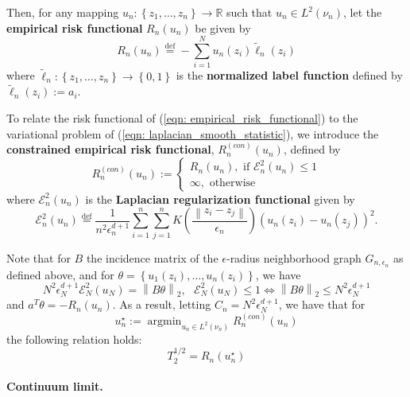 \documentclass{article}
\newcommand{\Reals}{\mathbb{R}}
\newcommand{\norm}[1]{\left\lVert#1\right\rVert}
\newcommand{\defeq}{\overset{\mathrm{def}}{=}}
\newcommand{\set}[1]{\left\{#1\right\}}
\DeclareMathOperator*{\argmin}{argmin}
\theoremstyle{alden}
\theoremstyle{aldenthm}
\theoremstyle{remark}
\begin{document}
Then, for any mapping $u_n: \set{z_1, \ldots, z_n} \to \Reals$ such that $u_n \in L^2(\nu_n)$, let the \textbf{empirical risk functional} $R_n(u_n)$ be given by
\begin{equation}
\label{eqn: empirical_risk_functional}
R_n(u_n) \defeq - \sum_{i = 1}^{N} u_n(z_i) \widetilde{\ell}_n(z_i)
\end{equation}
where $\widetilde{\ell}_n: \set{z_1, \ldots, z_n} \to \set{0,1}$ is the \textbf{normalized label function} defined by $\widetilde{\ell}_n(z_i) := a_i$. 

To relate the risk functional of (\ref{eqn: empirical_risk_functional}) to the variational problem of (\ref{eqn: laplacian_smooth_statistic}), we introduce the \textbf{constrained empirical risk functional}, $R_n^{(con)}(u_n)$, defined by
\begin{equation*}
R_n^{(con)}(u_n) := 
\begin{cases}
R_n(u_n), \text{ if $\mathcal{E}_n^2(u_n) \leq 1$} \\
\infty, \text{ otherwise }
\end{cases}
\end{equation*}
where $\mathcal{E}_n^2(u_n)$ is the \textbf{Laplacian regularization functional} given by
\begin{equation*}
\mathcal{E}_n^2(u_n) \defeq \frac{1}{n^2 \epsilon_n^{d+1}} \sum_{i = 1}^{n} \sum_{j = 1}^{n} K\left(\frac{\norm{z_i - z_j}}{\epsilon_n}\right)(u_n(z_i) - u_n(z_j))^2.
\end{equation*}

Note that for $B$ the incidence matrix of the $\epsilon$-radius neighborhood graph $G_{n,\epsilon_n}$ as defined above, and for $\theta = \set{u_1(z_i), \ldots, u_n(z_i)}$, we have
\begin{equation*}
N^2 \epsilon_N^{d+1} \mathcal{E}_N^2(u_N) = \norm{B \theta}_2, ~~~ \mathcal{E}_N^2(u_N) \leq 1 \Leftrightarrow \norm{B \theta}_2 \leq N^2 \epsilon_N^{d+1}
\end{equation*}
and $a^T \theta = - R_n(u_n)$.
As a result, letting $C_n = N^2 \epsilon_N^{d+1}$, we have that for
\begin{equation}
\label{eqn: minimizer_of_constrained_empirical_risk_functional}
u_n^{\star} := \argmin_{u_n \in L^2(\nu_n)} R_n^{(con)}(u_n)
\end{equation}
the following relation holds:
\begin{equation*}
T_2^{1/2} = R_n(u_n^{\star})
\end{equation*}

\paragraph{Continuum limit.}
\end{document}
